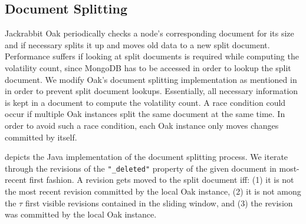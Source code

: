 \documentclass[abstracton,12pt]{scrartcl}
\theoremstyle{definition}
\begin{document}
\subsection{Document Splitting}

Jackrabbit Oak periodically checks a node's corresponding document for its size and if necessary splits it up and moves old data to a new split document.
Performance suffers if looking at split documents is required while computing the volatility count, since MongoDB has to be accessed in order to lookup the split document.
We modify Oak's document splitting implementation as mentioned in~\cite{KW17} in order to prevent split document lookups.
Essentially, all necessary information is kept in a document to compute the volatility count.
A race condition could occur if multiple Oak instances split the same document at the same time.
In order to avoid such a race condition, each Oak instance only moves changes committed by itself.

 depicts the Java implementation of the document splitting process.
We iterate through the revisions of the \texttt{"\_deleted"} property of the given document in most-recent first fashion.
A revision gets moved to the split document iff: (1) it is not the most recent revision committed by the local Oak instance, (2) it is not among the $\tau$ first visible revisions contained in the sliding window, and (3) the revision was committed by the local Oak instance.
\end{document}
